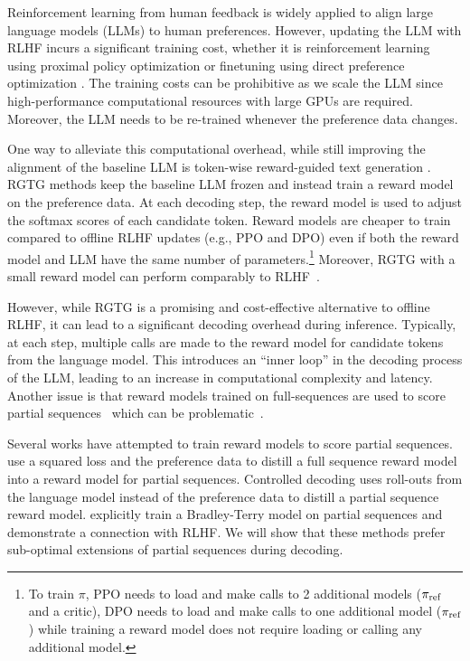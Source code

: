Reinforcement learning from human feedback \citep[RLHF][]{stiennon2020rlhf,ouyang2022training} is widely applied to align large language models (LLMs) to human preferences. 
However, updating the LLM with RLHF incurs a significant training cost, whether it is reinforcement learning using proximal policy optimization \citep[PPO,][]{schulman2017proximal} or finetuning using direct preference optimization \citep[DPO][]{rafailov2023direct}. 
The training costs can be prohibitive as we scale the LLM since high-performance computational resources with large GPUs are required. 
Moreover, the LLM needs to be re-trained whenever the preference data changes.

One way to alleviate this computational overhead, while still improving the alignment of the baseline LLM is token-wise reward-guided text generation \citep[RGTG][]{khanov2023alignment,deng2023reward}.
RGTG methods keep the baseline LLM frozen and instead train a reward model on the preference data. 
At each decoding step, the reward model is used to adjust the softmax scores of each candidate token. 
Reward models are cheaper to train compared to offline RLHF updates (e.g., PPO and DPO) even if both the reward model and LLM have the same number of parameters.\footnote{To train $\pi$, PPO needs to load and make calls to 2 additional models ($\pi_\text{ref}$ and a critic), DPO needs to load and make calls to one additional model ($\pi_\text{ref}$) while training a reward model does not require loading or calling any additional model.} 
Moreover, RGTG with a small reward model can perform comparably to RLHF~\citep{rashid2024critical}.   

However, while RGTG is a promising and cost-effective alternative to offline RLHF, it can lead to a significant decoding overhead during inference. 
Typically, at each step, multiple calls are made to the reward model for candidate tokens from the language model.
This introduces an ``inner loop'' in the decoding process of the LLM, leading to an increase in computational complexity and latency.
Another issue is that reward models trained on full-sequences are used to score partial sequences~\citep{khanov2023alignment,li2024cascade} which can be problematic~\citep{rashid2024critical}. 

Several works have attempted to train reward models to score partial sequences. 
\citet{deng2023reward} use a squared loss and the preference data to distill a full sequence reward model into a reward model for partial sequences. 
Controlled decoding \citep[CD;][]{mudgalcontrolled} uses roll-outs from the language model instead of the preference data to distill a partial sequence reward model. 
\citet{rashid2024critical} explicitly train a Bradley-Terry model on partial sequences and demonstrate a connection with RLHF. We will show that these methods prefer sub-optimal extensions of partial sequences during decoding. 

